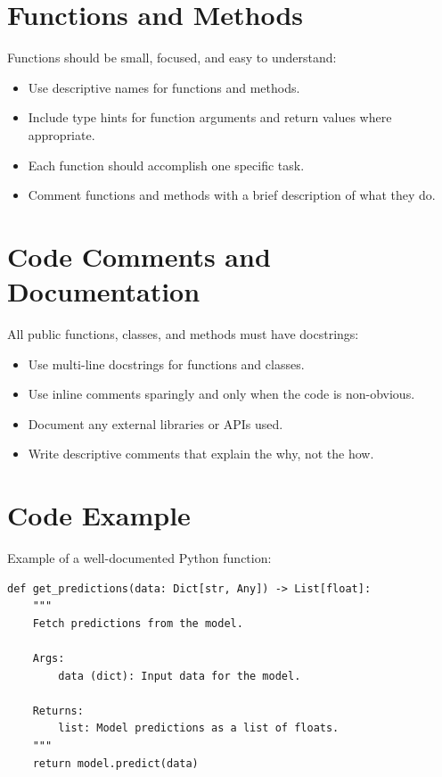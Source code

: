 \documentclass[11pt,a4paper]{article}
\begin{document}
\section*{Functions and Methods}
Functions should be small, focused, and easy to understand:
\begin{itemize}
    \item Use descriptive names for functions and methods.
    \item Include type hints for function arguments and return values where appropriate.
    \item Each function should accomplish one specific task.
    \item Comment functions and methods with a brief description of what they do.
\end{itemize}

\section*{Code Comments and Documentation}
All public functions, classes, and methods must have docstrings:
\begin{itemize}
    \item Use multi-line docstrings for functions and classes.
    \item Use inline comments sparingly and only when the code is non-obvious.
    \item Document any external libraries or APIs used.
    \item Write descriptive comments that explain the why, not the how.
\end{itemize}

\section*{Code Example}
Example of a well-documented Python function:
\begin{lstlisting}
def get_predictions(data: Dict[str, Any]) -> List[float]:
    """
    Fetch predictions from the model.

    Args:
        data (dict): Input data for the model.

    Returns:
        list: Model predictions as a list of floats.
    """
    return model.predict(data)
\end{lstlisting}
\pagebreak
\end{document}

